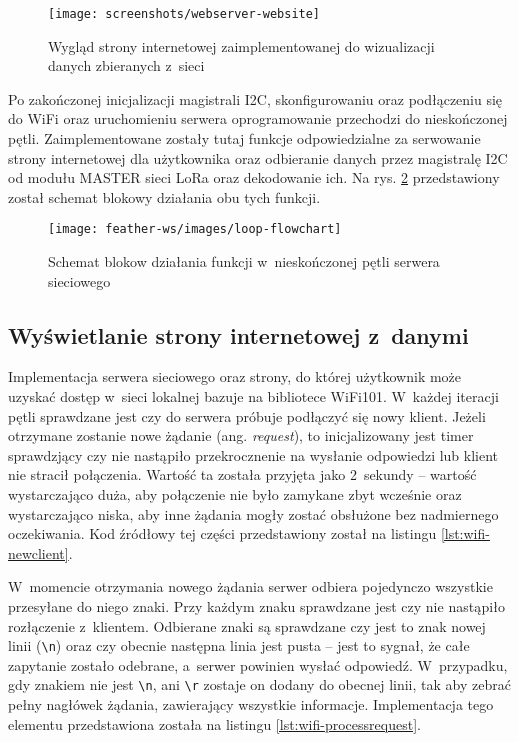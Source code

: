 \begin{figure}[!htbp]
    \centering
    \texttt{[image: screenshots/webserver-website]}
    \caption{\label{img:webserver-website}Wygląd strony internetowej zaimplementowanej do wizualizacji danych zbieranych
        z~sieci}
\end{figure}

Po zakończonej inicjalizacji magistrali I2C, skonfigurowaniu oraz podłączeniu się do WiFi oraz uruchomieniu serwera
oprogramowanie przechodzi do nieskończonej pętli. Zaimplementowane zostały tutaj funkcje odpowiedzialne za serwowanie
strony internetowej dla użytkownika oraz odbieranie danych przez magistralę I2C od modułu MASTER sieci LoRa oraz
dekodowanie ich. Na rys. \ref{img:webserver-flowchart} przedstawiony został schemat blokowy działania obu tych funkcji.

\begin{figure}[!htbp]
    \centering
    \texttt{[image: feather-ws/images/loop-flowchart]}
    \caption{\label{img:webserver-flowchart}Schemat blokow działania funkcji w~nieskończonej pętli serwera sieciowego}
\end{figure}

\subsection{\label{sect:webserver-website}Wyświetlanie strony internetowej z~danymi} Implementacja serwera sieciowego
oraz strony, do której użytkownik może uzyskać dostęp w~sieci lokalnej bazuje na bibliotece WiFi101. W~każdej iteracji
pętli sprawdzane jest czy do serwera próbuje podłączyć się nowy klient. Jeżeli otrzymane zostanie nowe żądanie (ang.
\textsl{request}), to inicjalizowany jest timer sprawdzjący czy nie nastąpiło przekrocznenie na wysłanie odpowiedzi lub
klient nie stracił połączenia. Wartość ta została przyjęta jako 2~sekundy -- wartość wystarczająco duża, aby połączenie
nie było zamykane zbyt wcześnie oraz wystarczająco niska, aby inne żądania mogły zostać obsłużone bez nadmiernego
oczekiwania. Kod źródłowy tej części przedstawiony został na listingu \ref{lst:wifi-newclient}.



W~momencie otrzymania nowego żądania serwer odbiera pojedynczo wszystkie przesyłane do niego znaki. Przy każdym znaku
sprawdzane jest czy nie nastąpiło rozłączenie z~klientem. Odbierane znaki są sprawdzane czy jest to znak nowej linii
(\texttt{\textbackslash n}) oraz czy obecnie następna linia jest pusta -- jest to sygnał, że całe zapytanie zostało
odebrane, a~serwer powinien wysłać odpowiedź. W~przypadku, gdy znakiem nie jest \texttt{\textbackslash n}, ani
\texttt{\textbackslash r} zostaje on dodany do obecnej linii, tak aby zebrać pełny nagłówek żądania, zawierający
wszystkie informacje. Implementacja tego elementu przedstawiona została na listingu \ref{lst:wifi-processrequest}.

